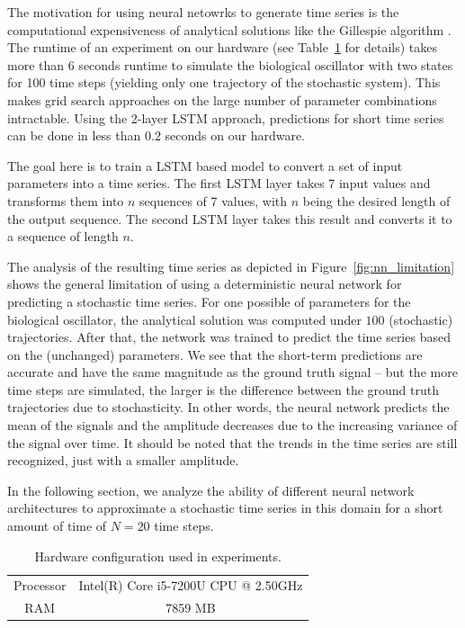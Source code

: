 \documentclass{article}
\begin{document}
The motivation for using neural netowrks to generate time series is the
computational expensiveness of analytical solutions like the Gillespie
algorithm \cite{gillespie1977}. The runtime of an experiment on our hardware
(see Table~\ref{tab:hardware} for details)
takes more than 6 seconds runtime to simulate the biological oscillator with two
states for 100 time steps (yielding only one trajectory of the stochastic 
system). This makes grid search approaches on the large number
of parameter
combinations intractable. Using the 2-layer LSTM approach, predictions for
short time series can be done in less than $0.2$ seconds on our hardware.

The goal here is to train a LSTM based
model to convert a set of input parameters into a time series. The first
LSTM layer
takes 7 input values and transforms them into $n$ sequences of 7 values, with
$n$ being the desired length of the output sequence. The second LSTM layer
takes this result and converts it to a sequence of length $n$.

The analysis of the resulting time series as depicted in
Figure~\ref{fig:nn_limitation} shows the general limitation of using a
deterministic neural network for predicting a stochastic time series. For one
possible of parameters for the biological oscillator, the analytical solution
was computed under $100$ (stochastic) trajectories. After that, the network was
trained to predict the time series based on the (unchanged) parameters. We see
that the short-term predictions are accurate and have the same magnitude as the
ground truth signal -- but the more time steps are simulated, the larger is the
difference between the ground truth trajectories due to stochasticity. In other
words, the neural network predicts the mean of the signals and the amplitude
decreases due to the increasing variance of the signal over time.
It should be noted that the trends in the time series are still
recognized, just with a smaller amplitude.

In the following section, we analyze the ability of different neural network
architectures to approximate a stochastic time series in this domain for a short
amount of time of $N=20$ time steps.

\begin{table}
  \centering
  \begin{tabular}{cc}
    Processor & Intel(R) Core i5-7200U CPU @ 2.50GHz \\
    RAM       & 7859 MB                              \\
  \end{tabular}
  \caption{Hardware configuration used in experiments.}
  \label{tab:hardware}
\end{table}
\end{document}
